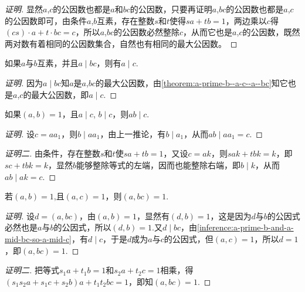 \begin{proof}[证明]
  显然$a$,$c$的公因数也都是$a$和$bc$的公因数，只要再证明$a$,$bc$的公因数也都是$a$,$c$的公因数即可，由条件$a$,$b$互素，存在整数$s$和$t$使得$sa+tb=1$，两边乘以$c$得$(cs)\cdot a+t\cdot bc=c$，所以$a$,$bc$的公因数必然整除$c$，从而它也是$a$,$c$的公因数，既然两对数有着相同的公因数集合，自然也有相同的最大公因数。
\end{proof}

\begin{inference}
  \label{inference:a-prime-b-and-a-mid-bc-so-a-mid-c}
  如果$a$与$b$互素，并且$a \mid bc$，则有$a \mid c$.
\end{inference}

\begin{proof}[证明]
  因为$a \mid bc$知$a$是$a$,$bc$的最大公因数，由\autoref{theorem:a-prime-b--a-c--a--bc}知它也是$a$,$c$的最大公因数，即$a \mid c$.
\end{proof}

\begin{inference}
  如果$(a,b)=1$，且$a \mid c$, $b \mid c$，则$ab \mid c$.
\end{inference}

\begin{proof}[证明]
  设$c=aa_1$，则$b \mid aa_1$，由上一推论，有$b \mid a_1$，从而$ab \mid aa_1=c$.
\end{proof}

\begin{proof}[证明二]
  由条件，存在整数$s$和$t$使$sa+tb=1$，又设$c=ak$，则$sak+tbk=k$，即$sc+tbk=k$，显然$b$能够整除等式的左端，因而也能整除右端，即$b \mid k$，从而$ab \mid ak=c$.
\end{proof}

\begin{inference}
  \label{inference:a-prime-b-and-a-prime-c-so-a-prime-bc}
  若$(a,b)=1$,且$(a,c)=1$，则$(a,bc)=1$.
\end{inference}

\begin{proof}[证明]
  设$d=(a,bc)$，由$(a,b)=1$，显然有$(d,b)=1$，这是因为$d$与$b$的公因式必然也是$a$与$b$的公因式，所以$(d,b)=1$.又$d \mid bc$，由\autoref{inference:a-prime-b-and-a-mid-bc-so-a-mid-c}，有$d \mid c$，于是$d$成为$a$与$c$的公因式，但$(a,c)=1$，所以$d=1$，即$(a,bc)=1$.
\end{proof}

\begin{proof}[证明二]
  把等式$s_1a+t_1b=1$和$s_2a+t_2c=1$相乘，得$(s_1s_2a+s_1c+s_2b)a+t_1t_2bc=1$，即知$(a,bc)=1$.
\end{proof}


